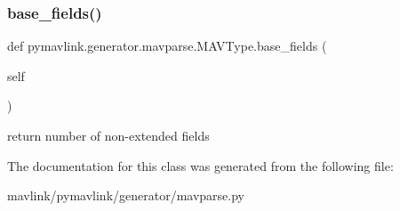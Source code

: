 \subsubsection{\texorpdfstring{base\+\_\+fields()}{base\_fields()}}
{\footnotesize\ttfamily def pymavlink.\+generator.\+mavparse.\+M\+A\+V\+Type.\+base\+\_\+fields (\begin{DoxyParamCaption}\item[{}]{self }\end{DoxyParamCaption})}

\begin{DoxyVerb}return number of non-extended fields\end{DoxyVerb}
 

The documentation for this class was generated from the following file\+:\begin{DoxyCompactItemize}
\item 
mavlink/pymavlink/generator/mavparse.\+py\end{DoxyCompactItemize}
